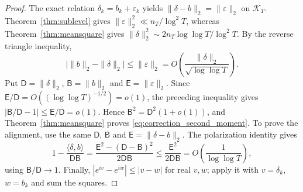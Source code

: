 \documentclass[11pt,a4paper]{article}
\makeatletter
\numberwithin{equation}{section}
\DeclareRobustCommand{\CGref}[1]{\ref{#1}}
\DeclareRobustCommand{\CGeqref}[1]{\eqref{#1}}
\let\CG@origref\ref
\let\CG@origeqref\eqref
\newcommand{\CG@gettip}[1]{\@ifundefined{CGTip@#1}{#1}{\csname CGTip@#1\endcsname}}
\DeclareRobustCommand{\CGref}[1]{\pdftooltip{\CG@origref{#1}}{\CG@gettip{#1}}}
\DeclareRobustCommand{\CGeqref}[1]{\pdftooltip{\CG@origeqref{#1}}{\CG@gettip{#1}}}
\theoremstyle{definition}
\theoremstyle{remark}
\makeatother
\begin{document}
\begin{proof}
The exact relation $\delta_k=b_k+\varepsilon_k$ yields
$\|\delta-b\|_2=\|\varepsilon\|_2$ on $\mathcal K_T$.
Theorem~\CGref{thm:sublevel} gives
$\|\varepsilon\|_2^2\ll n_T/\log^2T$, whereas
Theorem~\CGref{thm:meansquare} gives
$\|\delta\|_2^2\sim2n_T\log\log T/\log^2T$.
By the reverse triangle inequality,
\begin{equation}
\bigl|\|b\|_2-\|\delta\|_2\bigr|
\le\|\varepsilon\|_2
=O\!\left(\frac{\|\delta\|_2}{\sqrt{\log\log T}}\right).
\label{eq:disp_38}
\end{equation}
Put $\mathsf D=\|\delta\|_2$, $\mathsf B=\|b\|_2$ and $\mathsf E=\|\varepsilon\|_2$. Since $\mathsf E/\mathsf D=O((\log\log T)^{-1/2})=o(1)$, the preceding inequality gives $|\mathsf B/\mathsf D-1|\le \mathsf E/\mathsf D=o(1)$. Hence $\mathsf B^2=\mathsf D^2(1+o(1))$, and Theorem~\CGref{thm:meansquare} proves \CGeqref{eq:correction_second_moment}.
To prove the alignment, use the same $\mathsf D$, $\mathsf B$ and $\mathsf E=\|\delta-b\|_2$.
The polarization identity gives
\begin{equation}
1-\frac{\langle\delta,b\rangle}{\mathsf D\mathsf B}
=\frac{\mathsf E^2-(\mathsf D-\mathsf B)^2}{2\mathsf D\mathsf B}
\le\frac{\mathsf E^2}{2\mathsf D\mathsf B}
=O\!\left(\frac1{\log\log T}\right),
\label{eq:disp_39}
\end{equation}
using $\mathsf B/\mathsf D\to1$.
Finally, $|e^{iv}-e^{iw}|\le|v-w|$ for real $v,w$; apply it with
$v=\delta_k$, $w=b_k$ and sum the squares.
\end{proof}
\end{document}

